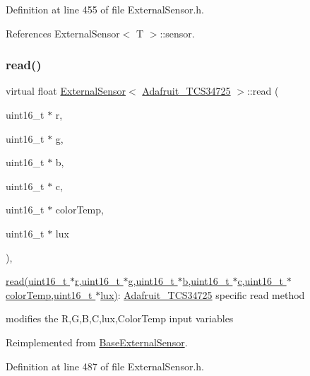 Definition at line 455 of file External\+Sensor.\+h.



References External\+Sensor$<$ T $>$\+::sensor.

\mbox{\label{class_external_sensor_3_01_adafruit___t_c_s34725_01_4_a0d020129b78253b2929e33c0148631cd}} 
\subsubsection{\texorpdfstring{read()}{read()}}
{\footnotesize\ttfamily virtual float \hyperlink{class_external_sensor}{External\+Sensor}$<$ \hyperlink{class_adafruit___t_c_s34725}{Adafruit\+\_\+\+T\+C\+S34725} $>$\+::read (\begin{DoxyParamCaption}\item[{uint16\+\_\+t $\ast$}]{r,  }\item[{uint16\+\_\+t $\ast$}]{g,  }\item[{uint16\+\_\+t $\ast$}]{b,  }\item[{uint16\+\_\+t $\ast$}]{c,  }\item[{uint16\+\_\+t $\ast$}]{color\+Temp,  }\item[{uint16\+\_\+t $\ast$}]{lux }\end{DoxyParamCaption})\hspace{0.3cm}{\ttfamily [inline]}, {\ttfamily [virtual]}}

\hyperlink{class_external_sensor_3_01_adafruit___t_c_s34725_01_4_a0d020129b78253b2929e33c0148631cd}{read(uint16\+\_\+t $\ast$r,uint16\+\_\+t $\ast$g,uint16\+\_\+t $\ast$b,uint16\+\_\+t $\ast$c,uint16\+\_\+t $\ast$color\+Temp,uint16\+\_\+t $\ast$lux)}\+: \hyperlink{class_adafruit___t_c_s34725}{Adafruit\+\_\+\+T\+C\+S34725} specific read method

modifies the R,G,B,C,lux,Color\+Temp input variables 

Reimplemented from \hyperlink{class_base_external_sensor_ab1f906fc55c0cc2c55a38a85167199ee}{Base\+External\+Sensor}.



Definition at line 487 of file External\+Sensor.\+h.



